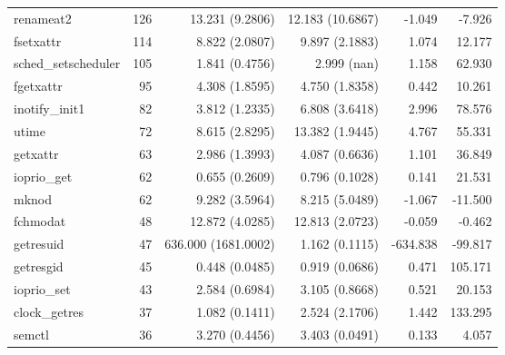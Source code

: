 \begin{longtable}{>{\ttfamily}lrrrrr}
                      renameat2 &        126 &          13.231 (9.2806) &         12.183 (10.6867) &          -1.049 &       -7.926 \\
                      fsetxattr &        114 &           8.822 (2.0807) &           9.897 (2.1883) &           1.074 &       12.177 \\
            sched\_setscheduler &        105 &           1.841 (0.4756) &              2.999 (nan) &           1.158 &       62.930 \\
                      fgetxattr &         95 &           4.308 (1.8595) &           4.750 (1.8358) &           0.442 &       10.261 \\
                 inotify\_init1 &         82 &           3.812 (1.2335) &           6.808 (3.6418) &           2.996 &       78.576 \\
                          utime &         72 &           8.615 (2.8295) &          13.382 (1.9445) &           4.767 &       55.331 \\
                       getxattr &         63 &           2.986 (1.3993) &           4.087 (0.6636) &           1.101 &       36.849 \\
                    ioprio\_get &         62 &           0.655 (0.2609) &           0.796 (0.1028) &           0.141 &       21.531 \\
                          mknod &         62 &           9.282 (3.5964) &           8.215 (5.0489) &          -1.067 &      -11.500 \\
                       fchmodat &         48 &          12.872 (4.0285) &          12.813 (2.0723) &          -0.059 &       -0.462 \\
                      getresuid &         47 &      636.000 (1681.0002) &           1.162 (0.1115) &        -634.838 &      -99.817 \\
                      getresgid &         45 &           0.448 (0.0485) &           0.919 (0.0686) &           0.471 &      105.171 \\
                    ioprio\_set &         43 &           2.584 (0.6984) &           3.105 (0.8668) &           0.521 &       20.153 \\
                  clock\_getres &         37 &           1.082 (0.1411) &           2.524 (2.1706) &           1.442 &      133.295 \\
                         semctl &         36 &           3.270 (0.4456) &           3.403 (0.0491) &           0.133 &        4.057 \\

\end{longtable}
